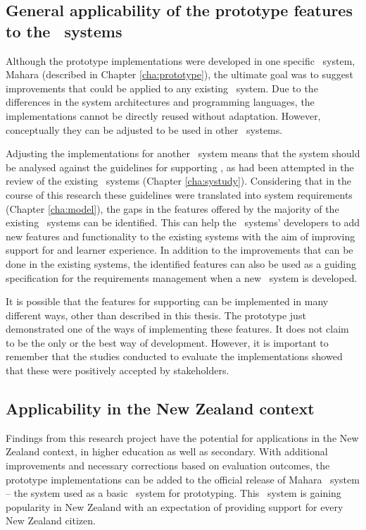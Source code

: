 \subsection[General applicability]{General applicability of the prototype
features to the \ep~systems}

Although the prototype implementations were developed in one specific
\ep~system, Mahara (described in Chapter \ref{cha:prototype}), the ultimate goal
was to suggest improvements that could be applied to any existing \ep~system.
Due to the differences in the system architectures and programming languages,
the implementations cannot be directly reused without adaptation. However,
conceptually they can be adjusted to be used in other \ep~systems.

Adjusting the implementations for another \ep~system means that the system
should be analysed against the guidelines for supporting \LLLsn, as had been
attempted in the review of the existing \ep~systems (Chapter \ref{cha:systudy}).
Considering that in the course of this research these guidelines were translated
into system requirements (Chapter \ref{cha:model}), the gaps in the features
offered by the majority of the existing \ep~systems can be identified. This can
help the \ep~systems' developers to add new features and functionality to the
existing systems with the aim of improving support for \LLLs and learner
experience. In addition to the improvements that can be done in the existing
systems, the identified features can also be used as a guiding specification for
the requirements management when a new \ep~system is developed.

It is possible that the features for supporting \LLLs can be implemented in many
different ways, other than described in this thesis. The prototype just
demonstrated one of the ways of implementing these features. It does not claim
to be the only or the best way of development. However, it is important to
remember that the studies conducted to evaluate the implementations showed that
these were positively accepted by stakeholders.

\subsection{Applicability in the New Zealand context}

Findings from this research project have the potential for applications in the
New Zealand context, in higher education as well as secondary. With additional
improvements and necessary corrections based on evaluation outcomes, the
prototype implementations can be added to the official release of Mahara
\ep~system -- the system used as a basic \ep~system for prototyping. This
\ep~system is gaining popularity in New Zealand with an expectation of
providing \LLLs support for every New Zealand citizen.

